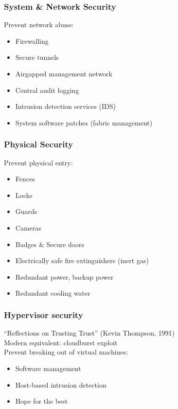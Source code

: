 \documentclass{beamer}
\begin{document}
\begin{frame}
    \frametitle{System \& Network Security}
    Prevent network abuse:
    \begin{itemize}
      \item Firewalling
      \item Secure tunnels %
      \item Airgapped management network
      \item Central audit logging
      \item Intrusion detection services (IDS)
      \item System software patches (fabric management)
    \end{itemize}
\end{frame}

\begin{frame}
    \frametitle{Physical Security}
    Prevent physical entry:
    \begin{itemize}
      \item Fences
      \item Locks
      \item Guards
      \item Cameras
      \item Badges \& Secure doors
      \item Electrically safe fire extinguishers (inert gas)
      \item Redundant power, backup power
      \item Redundant cooling water
    \end{itemize}
\end{frame}

\begin{frame}
    \frametitle{Hypervisor security}
    ``Reflections on Trusting Trust'' (Kevin Thompson, 1991) \\
    Modern equivalent: cloudburst exploit \\
    Prevent breaking out of virtual machines:
    \begin{itemize}
      \item Software management
      \item Host-based intrusion detection
      \item Hope for the best
    \end{itemize}
\end{frame}
\end{document}
